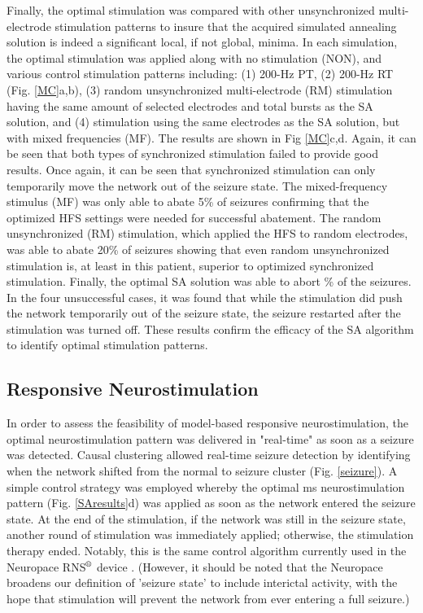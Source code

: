 \documentclass[11pt,a4paper,final]{article}
\begin{document}
Finally, the optimal stimulation was compared with other unsynchronized multi-electrode stimulation patterns to insure that the acquired simulated annealing solution is indeed a significant local, if not global, minima.
In each simulation, the optimal stimulation was applied along with no stimulation (NON), and various control stimulation patterns including:
(1) 200-Hz PT,
(2) 200-Hz RT (Fig. \ref{MC}a,b),
(3) random unsynchronized multi-electrode (RM) stimulation having the same amount of selected electrodes and total bursts as the SA solution, and
(4) stimulation using the same electrodes as the SA solution, but with mixed frequencies (MF).
The results are shown in Fig \ref{MC}c,d.
Again, it can be seen that both types of synchronized stimulation failed to provide good results.
Once again, it can be seen that synchronized stimulation can only  temporarily move the network out of the seizure state.
The mixed-frequency stimulus (MF) was only able to abate 5\% of seizures confirming that the optimized HFS settings were needed for successful abatement.
The random unsynchronized (RM) stimulation, which applied the HFS to random electrodes, was able to abate 20\% of seizures showing that even random unsynchronized stimulation is, at least in this patient, superior to optimized synchronized stimulation.
Finally, the optimal SA solution was able to abort \success{}\% of the seizures.
In the four unsuccessful cases, it was found that while the stimulation did push the network temporarily out of the seizure state, the seizure restarted after the stimulation was turned off. 
These results confirm the efficacy of the SA algorithm to identify optimal stimulation patterns.
    
    \subsection{Responsive Neurostimulation}

In order to assess the feasibility of model-based responsive neurostimulation, the optimal neurostimulation pattern was delivered in "real-time" as soon as a seizure was detected.
Causal clustering allowed real-time seizure detection by identifying when the network shifted from the normal to seizure cluster (Fig. \ref{seizure}).
A simple control strategy was employed whereby the optimal \len{} ms neurostimulation pattern (Fig. \ref{SAresults}d) was applied as soon as the network entered the seizure state.
At the end of the stimulation, if the network was still in the seizure state, another round of stimulation was immediately applied; otherwise, the stimulation therapy ended.
Notably, this is the same control algorithm currently used in the Neuropace RNS$\textsuperscript{\textregistered}$ device \citep{NP}.
(However, it should be noted that the Neuropace broadens our definition of 'seizure state' to include interictal activity, with the hope that stimulation will prevent the network from ever entering a full seizure.)
\end{document}
